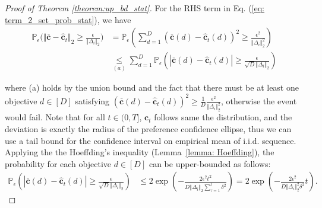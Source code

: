 \begin{proof}[Proof of Theorem \ref{theorem:up_bd_stat}]

For the RHS term in Eq. (\ref{eq: term_2_set_prob_stat}), we have 
\begin{equation}
\begin{aligned}
\label{eq: term_2_prob_2_stat}
\mathbb{P}_{\epsilon} \bigg( 
\Vert \overline{\boldsymbol{c}} - \hat{\boldsymbol{c}}_t \Vert_2 
\geq \frac{\epsilon}{ \Vert \Delta_{i} \Vert_2 } \bigg) 
& =
\mathbb{P}_{\epsilon} \left( \sum_{d = 1}^{D} \left( \overline{\boldsymbol{c}} (d) - \hat{\boldsymbol{c}}_t (d) \right)^2 
\geq
\frac{\epsilon^2}{ \Vert \Delta_{i} \Vert_2^2 } \right) \\
& \underset{(a)}{\leq}
\sum_{d = 1}^{D} \mathbb{P}_{\epsilon} \left( | \overline{\boldsymbol{c}} (d) - \hat{\boldsymbol{c}}_t (d) | \geq 
\frac{\epsilon}{\sqrt{D} \Vert \Delta_{i} \Vert_2 } \right)
\end{aligned}
\end{equation}

where (a) holds by the union bound and the fact that there must be at least one objective $d \in [D]$ satisfying $\left( \overline{\boldsymbol{c}} (d) - \hat{\boldsymbol{c}}_t (d) \right)^2 \geq \frac{1}{D} \frac{\epsilon^2}{ \Vert \Delta_{i} \Vert_2^2 }$, otherwise the event would fail.
Note that for all $t \in (0, T]$, ${\boldsymbol{c}}_t$ follows same the distribution, and the deviation is exactly the radius of the preference confidence ellipse, thus we can use a tail bound for the confidence interval on empirical mean of i.i.d. sequence. 
Applying the the Hoeffding's inequality (Lemma~\ref{lemma: Hoeffding}), the probability for each objective $d \in [D]$ can be upper-bounded as follows:
\begin{equation}
\begin{aligned}
\mathbb{P}_{\epsilon} \left( | \overline{\boldsymbol{c}} (d) - \hat{\boldsymbol{c}}_t (d) | \geq 
\frac{\epsilon}{\sqrt{D} \Vert \Delta_{i} \Vert_2 } \right)
& \leq
2 \exp \left( - \frac{ 2 \epsilon^2 t^2 }{ D \Vert \Delta_{i} \Vert_2 \sum_{\tau=1}^{t} \delta^2 } \right)
=
2 \exp \left( - \frac{ 2 \epsilon^2 }{ D \Vert \Delta_{i} \Vert_2^2 \delta^2 } t \right).
\end{aligned}
\end{equation} 



\end{proof}
